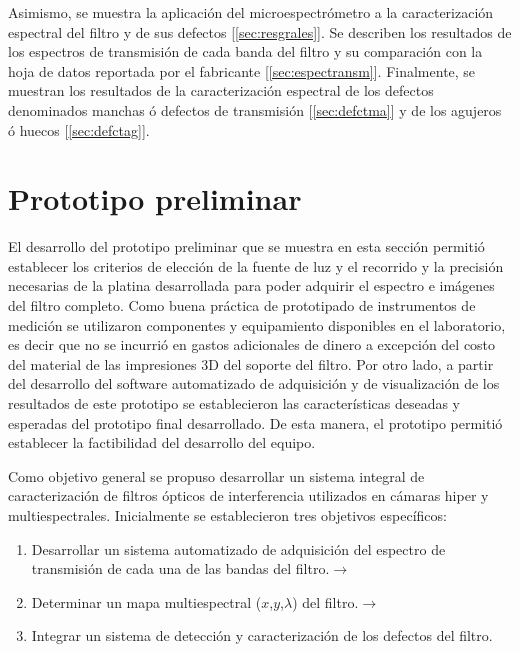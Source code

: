 Asimismo, se muestra la aplicación del microespectrómetro a la caracterización espectral del filtro y de sus defectos [\ref{sec:resgrales}]. Se describen los resultados de los espectros de transmisión de cada banda del filtro y su comparación con la hoja de datos reportada por el fabricante [\ref{sec:espectransm}]. Finalmente, se muestran los resultados de la caracterización espectral de los defectos denominados manchas ó defectos de transmisión [\ref{sec:defctma}] y de los agujeros ó huecos [\ref{sec:defctag}].


\singlespacing
\section{Prototipo preliminar \href{https://github.com/jrr1984/Prototipo0\_S-D\_SpectralGUI}{\faGithub}}
\label{sec:prot0}

\hspace{0.5cm}El desarrollo del prototipo preliminar que se muestra en esta sección permitió establecer los criterios de elección de la fuente de luz y el recorrido y la precisión necesarias de la platina desarrollada para poder adquirir el espectro e imágenes del filtro completo. Como buena práctica de prototipado de instrumentos de medición se utilizaron componentes y equipamiento disponibles en el laboratorio, es decir que no se incurrió en gastos adicionales de dinero a excepción del costo del material de las impresiones 3D del soporte del filtro. Por otro lado, a partir del desarrollo del software automatizado de adquisición y de visualización de los resultados de este prototipo se establecieron las características deseadas y esperadas del prototipo final desarrollado. De esta manera, el prototipo permitió establecer la factibilidad del desarrollo del equipo.

Como objetivo general se propuso desarrollar un sistema integral de caracterización de filtros ópticos de interferencia utilizados en cámaras hiper y multiespectrales. Inicialmente se establecieron tres objetivos específicos:
\begin{enumerate}
\item Desarrollar un sistema automatizado de adquisición del espectro de transmisión de cada una de las bandas del filtro.$\xrightarrow{}$ \href{https://github.com/jrr1984/Prototipo0\_S-D\_SpectralGUI/blob/master/barrido/std}{\faGithub}

\item Determinar un mapa multiespectral ($\textit{x}$,$\textit{y}$,$\lambda$) del filtro.$\xrightarrow{}$ \href{https://github.com/jrr1984/Prototipo0\_S-D\_SpectralGUI/blob/master/spectral\_gui/main.py}{\faGithub}

\item Integrar un sistema de detección y caracterización de los defectos del filtro.
\end{enumerate}

